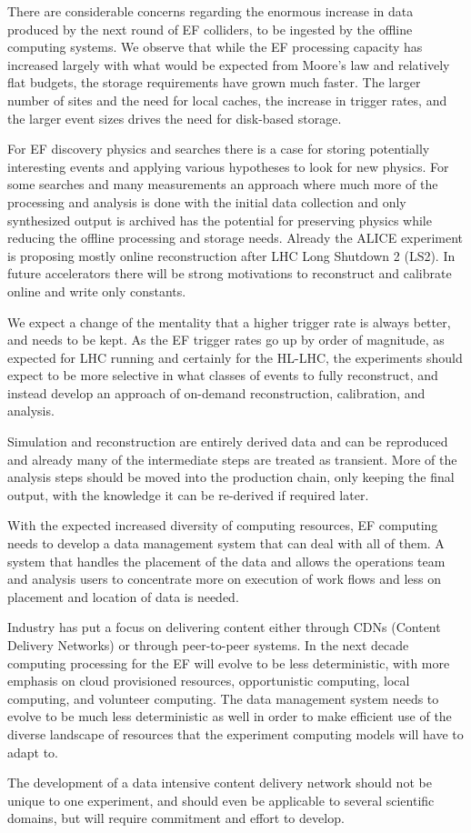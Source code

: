 There are considerable concerns regarding the enormous increase 
in data produced by the next round of EF colliders,  
to be ingested by the offline computing systems. 
We observe that while
the EF processing capacity has increased largely with what would be expected from
Moore's law and relatively flat budgets, the storage requirements have
grown much faster.  The larger number of sites and the need for local
caches, the increase in trigger rates, and the larger event sizes
drives the need for disk-based storage.  

For EF discovery physics and searches there is a case for storing
potentially interesting events and applying various hypotheses to look
for new physics.  For some searches and many measurements an approach
where much more of the processing and analysis is done with the
initial data collection and only synthesized output is archived has
the potential for preserving physics while reducing the offline
processing and storage needs.  Already the ALICE experiment is
proposing mostly online reconstruction after LHC Long Shutdown 2
(LS2).  In future accelerators there will be strong
motivations to reconstruct and calibrate online and write only
constants.

We expect a change of the mentality that a higher trigger rate is always better, and needs to be kept.  As the EF trigger rates go up by order of magnitude, as expected for LHC running and certainly for the HL-LHC, the experiments should expect to be more
selective in what classes of events to fully reconstruct, and instead develop an approach of on-demand reconstruction, calibration, and
analysis.

Simulation and reconstruction are entirely
derived data and can be reproduced and already many of the
intermediate steps are treated as transient.  More of the analysis steps should be moved into the production
chain, only keeping the final output, with the knowledge it can be
re-derived if required later.

With the expected increased diversity of computing resources, EF
computing needs to develop a data management system that can deal with
all of them.  A system that handles the placement of the data and
allows the operations team and analysis users to concentrate more on
execution of work flows and less on placement and location of data is
needed.  

Industry has put a focus on delivering
content either through CDNs (Content Delivery Networks) 
or through peer-to-peer systems.  In the
next decade computing processing for the EF will evolve
to be less deterministic, with more emphasis on cloud provisioned
resources, opportunistic computing, local computing, and volunteer
computing.  The data management system needs to evolve to be much less
deterministic as well in order to make efficient use of the diverse
landscape of resources that the experiment computing models will have to adapt to. 

The development of a data intensive content delivery network
should not be unique to one experiment, and should even be applicable
to several scientific domains, but will require commitment and effort
to develop.


